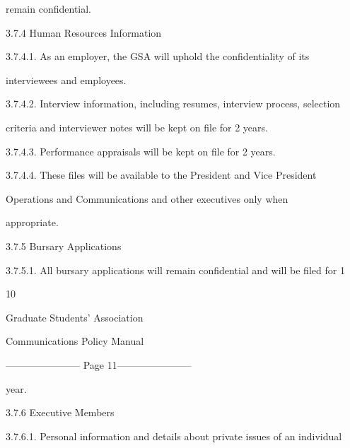              remain confidential.   



3.7.4  Human Resources Information  

  

  3.7.4.1.   As   an   employer,   the   GSA   will   uphold   the   confidentiality   of   its  



             interviewees and employees.   



  3.7.4.2.   Interview  information,  including  resumes,  interview  process,  selection  



             criteria and interviewer notes will be kept on file for 2 years.   



  3.7.4.3.   Performance appraisals will be kept on file for 2 years.   



  3.7.4.4.   These   files   will   be   available   to   the   President   and   Vice   President  



             Operations   and   Communications   and   other   executives   only   when  



             appropriate.   



3.7.5  Bursary Applications  

  

3.7.5.1. All bursary applications will remain confidential and will be filed for 1  

                                                    10  

                                    

                                  Graduate Students’ Association  

                                  Communications Policy Manual  

  


----------------------- Page 11-----------------------

year.  

  

3.7.6  Executive Members  

  

3.7.6.1. Personal information and details about private issues of an individual  



